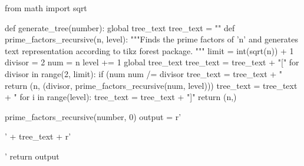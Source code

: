 \pgfplotsset{compat=1.17}
\footer{}{\thepage}{}
\setlength{\parindent}{0pt}
\graphicspath{{../Images}} %
\checkboxchar{$\Box$}
\bracketedpoints
{}

\newenvironment{mybox}[3][]{%
  \begin{tikzpicture}[#1]%
    \def\myboxname{#3}%
    \node [draw, inner sep=0ex,  align=justify, draw=none]
      (BOXCONTENT) \bgroup\rule{0ex}{0ex}\ignorespaces
  }{%
    \egroup;
    \node [right, inner sep=3pt, fill=colorrds!75, outer sep=0pt, 
      text height=2ex, text depth=.5ex] (BOXNAME) 
      at ([shift={(-1em,5pt)}]BOXCONTENT.north west) {\myboxname};
    \fill[colorrds] (BOXNAME.north east) -- +(-1em,1em)
      -- +(-1em,0) -- cycle;
    \fill[colorrds] (BOXNAME.south west) -- +(1em,-1em)
      -- +(1em,0) -- cycle;
  \end{tikzpicture}
}
\begin{pycode}
  from math import sqrt
  
  def generate_tree(number):
          global tree_text
          tree_text = ""
          def prime_factors_recursive(n, level): 
                  """Finds the prime factors of 'n' and generates text representation
                       according to tikz forest package.
                  """ 
                  limit = int(sqrt(n)) + 1
                  divisor = 2
                  num = n
                  level += 1
                  global tree_text
                  tree_text = tree_text + "["
                  for divisor in range(2, limit): 
                          if (num %
                                  num /= divisor 
                                  tree_text = tree_text + "%
                                  return (n, (divisor, prime_factors_recursive(num, level)))
                  tree_text = tree_text + "%
                  for i in range(level):
                          tree_text = tree_text + "]"
                  return (n,)
  
          prime_factors_recursive(number, 0)
          output = r'\begin{forest}' + tree_text + r'\end{forest}'
          return output
  
  \end{pycode}
  
  \newcommand{\PrimeTree}[1]{%
  \py{generate_tree(#1)}
  }
